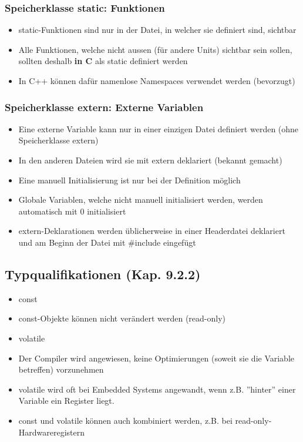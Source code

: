 \subsubsection{Speicherklasse static: Funktionen}
\label{sec:Speicherklasse static: Funktionen}
\begin{itemize}
	\item static-Funktionen sind nur in der Datei, in welcher sie definiert sind, sichtbar
	\item Alle Funktionen, welche nicht aussen (für andere Units) sichtbar sein sollen, sollten deshalb \textbf{in C} als static definiert werden\color{red}
	\item In C++ können dafür namenlose Namespaces verwendet werden (bevorzugt)\color{black}
\end{itemize}

\subsubsection{Speicherklasse extern: Externe Variablen}
\label{sec:Speicherklasse extern: Externe Variablen}
\begin{itemize}
	\item Eine externe Variable kann nur in einer einzigen Datei definiert werden (ohne Speicherklasse extern)
	\item In den anderen Dateien wird sie mit extern deklariert (bekannt gemacht)
	\item Eine manuell Initialisierung ist nur bei der Definition möglich
	\item Globale Variablen, welche nicht manuell initialisiert werden, werden automatisch mit 0 initialisiert
	\item extern-Deklarationen werden üblicherweise in einer Headerdatei deklariert und am Beginn der Datei mit \#include eingefügt
\end{itemize}

\subsection{Typqualifikationen (Kap. 9.2.2)}
\label{sec:Typqualifikationen (Kap. 9.2.2)}
\begin{itemize}
	\item const
	\item[\-] const-Objekte können nicht verändert werden (read-only)
	\item volatile
	\item[\-]Der Compiler wird angewiesen, keine Optimierungen (soweit sie die Variable betreffen) vorzunehmen
	\item volatile wird oft bei Embedded Systems angewandt, wenn z.B. ''hinter'' einer Variable ein Register liegt.
	\item const und volatile können auch kombiniert werden, z.B. bei read-only-Hardwareregistern
\end{itemize}

